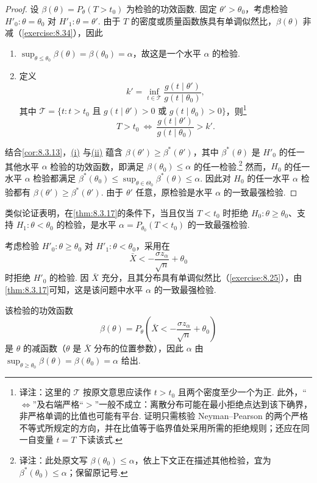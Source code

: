 \begin{proof}
设 $\beta(\theta)=P_\theta(T>t_0)$ 为检验的功效函数. 固定 $\theta'>\theta_0$，考虑检验 $H'_0:\theta=\theta_0$ 对 $H'_1:\theta=\theta'$. 由于 $T$ 的密度或质量函数族具有单调似然比，$\beta(\theta)$ 非减（\autoref{exercise:8.34}），因此
\begin{enumerate}[label=\roman*.]
\item{}\label{itm:proof:8.3.17:i} $\sup_{\theta\le\theta_0}\beta(\theta)=\beta(\theta_0)=\alpha$，故这是一个水平 $\alpha$ 的检验.
\item{}\label{itm:proof:8.3.17:ii} 定义
$$k'=\inf_{t\in\mathscr T}\frac{g(t\mid\theta')}{g(t\mid\theta_0)},$$
其中 $\mathscr T=\{t:t>t_0\text{ 且 }g(t\mid\theta')>0\text{ 或 }g(t\mid\theta_0)>0\}$，则\footnote{译注：这里的 $\mathscr T$ 按原文意思应读作 $t>t_0$ 且两个密度至少一个为正. 此外，“$\Longleftrightarrow$”及右端严格“$>$”一般不成立：离散分布可能在最小拒绝点达到该下确界，非严格单调的比值也可能有平台. 证明只需核验 Neyman–Pearson 的两个严格不等式所规定的方向，并在比值等于临界值处采用所需的拒绝规则；还应在同一自变量 $t=T$ 下读该式.}
$$T>t_0\ \Longleftrightarrow\ \frac{g(t\mid\theta')}{g(t\mid\theta_0)}>k'.$$
\end{enumerate}

结合\autoref{cor:8.3.13}，\hyperref[itm:proof:8.3.17:i]{(i)} 与\hyperref[itm:proof:8.3.17:ii]{(ii)} 蕴含 $\beta(\theta')\ge\beta^*(\theta')$，其中 $\beta^*(\theta)$ 是 $H'_0$ 的任一其他水平 $\alpha$ 检验的功效函数，即满足 $\beta(\theta_0)\le\alpha$ 的任一检验.\footnote{译注：此处原文写 $\beta(\theta_0)\le\alpha$，依上下文正在描述其他检验，宜为 $\beta^*(\theta_0)\le\alpha$；保留原记号.} 然而，$H_0$ 的任一水平 $\alpha$ 检验都满足 $\beta^*(\theta_0)\le\sup_{\theta\in\Theta_0}\beta^*(\theta)\le\alpha$. 因此对 $H_0$ 的任一水平 $\alpha$ 检验都有 $\beta(\theta')\ge\beta^*(\theta')$. 由于 $\theta'$ 任意，原检验是水平 $\alpha$ 的一致最强检验.
\end{proof}
类似论证表明，在\autoref{thm:8.3.17}的条件下，当且仅当 $T<t_0$ 时拒绝 $H_0:\theta\ge\theta_0$、支持 $H_1:\theta<\theta_0$ 的检验，是水平 $\alpha=P_{\theta_0}(T<t_0)$ 的一致最强检验.
\begin{example}[续\autoref{ex:8.3.15}]\label{ex:8.3.18}
考虑检验 $H'_0:\theta\ge\theta_0$ 对 $H'_1:\theta<\theta_0$，采用在
$$\bar X<-\frac{\sigma z_\alpha}{\sqrt n}+\theta_0$$
时拒绝 $H'_0$ 的检验. 因 $\bar X$ 充分，且其分布具有单调似然比（\autoref{exercise:8.25}），由\autoref{thm:8.3.17}可知，这是该问题中水平 $\alpha$ 的一致最强检验.

该检验的功效函数
$$\beta(\theta)=P_\theta\left(\bar X<-\frac{\sigma z_\alpha}{\sqrt n}+\theta_0\right)$$
是 $\theta$ 的减函数（$\theta$ 是 $\bar X$ 分布的位置参数），因此 $\alpha$ 由 $\sup_{\theta\ge\theta_0}\beta(\theta)=\beta(\theta_0)=\alpha$ 给出.
\end{example}
